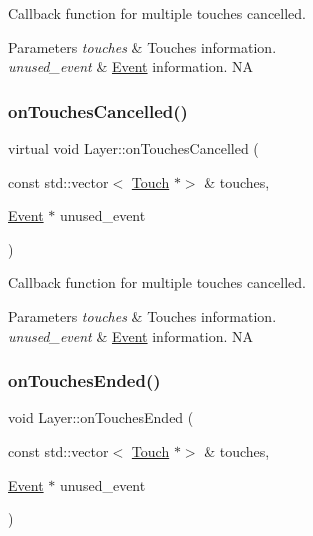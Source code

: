 Callback function for multiple touches cancelled.


\begin{DoxyParams}{Parameters}
{\em touches} & Touches information. \\
\hline
{\em unused\+\_\+event} & \hyperlink{classEvent}{Event} information.  NA \\
\hline
\end{DoxyParams}
\mbox{\label{classLayer_aeb1f39e95ed1940697aa6fe9de0d6419}} 
\subsubsection{\texorpdfstring{on\+Touches\+Cancelled()}{onTouchesCancelled()}\hspace{0.1cm}{\footnotesize\ttfamily [2/2]}}
{\footnotesize\ttfamily virtual void Layer\+::on\+Touches\+Cancelled (\begin{DoxyParamCaption}\item[{const std\+::vector$<$ \hyperlink{classTouch}{Touch} $\ast$$>$ \&}]{touches,  }\item[{\hyperlink{classEvent}{Event} $\ast$}]{unused\+\_\+event }\end{DoxyParamCaption})\hspace{0.3cm}{\ttfamily [virtual]}}

Callback function for multiple touches cancelled.


\begin{DoxyParams}{Parameters}
{\em touches} & Touches information. \\
\hline
{\em unused\+\_\+event} & \hyperlink{classEvent}{Event} information.  NA \\
\hline
\end{DoxyParams}
\mbox{\label{classLayer_a25edcc53db05941565bcd2e09e8149aa}} 
\subsubsection{\texorpdfstring{on\+Touches\+Ended()}{onTouchesEnded()}\hspace{0.1cm}{\footnotesize\ttfamily [1/2]}}
{\footnotesize\ttfamily void Layer\+::on\+Touches\+Ended (\begin{DoxyParamCaption}\item[{const std\+::vector$<$ \hyperlink{classTouch}{Touch} $\ast$$>$ \&}]{touches,  }\item[{\hyperlink{classEvent}{Event} $\ast$}]{unused\+\_\+event }\end{DoxyParamCaption})\hspace{0.3cm}{\ttfamily [virtual]}}

